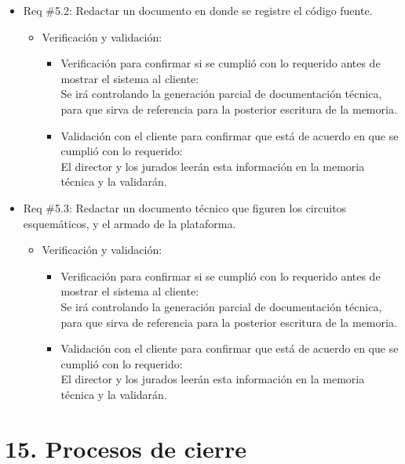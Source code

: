 \documentclass[
11pt, %
codirector, %
]{charter}
\begin{document}
\begin{itemize}
\item Req \#5.2: Redactar un documento en donde se registre el código fuente. 
\begin{itemize}
\item Verificación y validación:
	\begin{itemize}
	\item Verificación para confirmar si se cumplió con lo requerido 	antes de mostrar el sistema al cliente:\\
	Se irá controlando la generación parcial de documentación
	técnica, para que sirva de referencia para la posterior
	escritura de la memoria.
	\item Validación con el cliente para confirmar que está de 				acuerdo en que se cumplió con lo requerido:\\
	El director y los jurados leerán esta información en la memoria
	técnica y la validarán.
	\end{itemize}
\end{itemize}
\end{itemize}

\begin{itemize}
\item Req \#5.3: Redactar un documento técnico que figuren los circuitos esquemáticos, y el armado de la plataforma.
\begin{itemize}
\item Verificación y validación:
	\begin{itemize}
	\item Verificación para confirmar si se cumplió con lo requerido 	antes de mostrar el sistema al cliente:\\
	Se irá controlando la generación parcial de documentación
	técnica, para que sirva de referencia para la posterior
	escritura de la memoria.
	\item Validación con el cliente para confirmar que está de 				acuerdo en que se cumplió con lo requerido:\\
	El director y los jurados leerán esta información en la memoria
	técnica y la validarán.   
	\end{itemize}
\end{itemize}
\end{itemize}

\clearpage

\section{15. Procesos de cierre}    
\label{sec:cierre}
\end{document}
